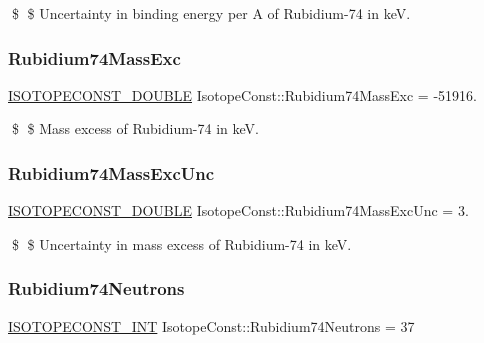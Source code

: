 \$ \$ Uncertainty in binding energy per A of Rubidium-\/74 in keV. \mbox{\label{group___isotope_const-_rubidium-_rb74_gadcb070c185ef9291f2c76c43ed71c848}} 
\subsubsection{\texorpdfstring{Rubidium74\+Mass\+Exc}{Rubidium74MassExc}}
{\footnotesize\ttfamily \mbox{\hyperlink{group___isotope_const-_macros_ga8f45a7272ce02c0b4c65c44636ed719a}{I\+S\+O\+T\+O\+P\+E\+C\+O\+N\+S\+T\+\_\+\+D\+O\+U\+B\+LE}} Isotope\+Const\+::\+Rubidium74\+Mass\+Exc = -\/51916.}

\$ \$ Mass excess of Rubidium-\/74 in keV. \mbox{\label{group___isotope_const-_rubidium-_rb74_ga244b2687c80c135fd0f00b9d14a681b2}} 
\subsubsection{\texorpdfstring{Rubidium74\+Mass\+Exc\+Unc}{Rubidium74MassExcUnc}}
{\footnotesize\ttfamily \mbox{\hyperlink{group___isotope_const-_macros_ga8f45a7272ce02c0b4c65c44636ed719a}{I\+S\+O\+T\+O\+P\+E\+C\+O\+N\+S\+T\+\_\+\+D\+O\+U\+B\+LE}} Isotope\+Const\+::\+Rubidium74\+Mass\+Exc\+Unc = 3.}

\$ \$ Uncertainty in mass excess of Rubidium-\/74 in keV. \mbox{\label{group___isotope_const-_rubidium-_rb74_ga1ad68b2d22cb34050f61d0807ac40c2b}} 
\subsubsection{\texorpdfstring{Rubidium74\+Neutrons}{Rubidium74Neutrons}}
{\footnotesize\ttfamily \mbox{\hyperlink{group___isotope_const-_macros_ga5f18360b3e99483a35c32d789e62621c}{I\+S\+O\+T\+O\+P\+E\+C\+O\+N\+S\+T\+\_\+\+I\+NT}} Isotope\+Const\+::\+Rubidium74\+Neutrons = 37}

